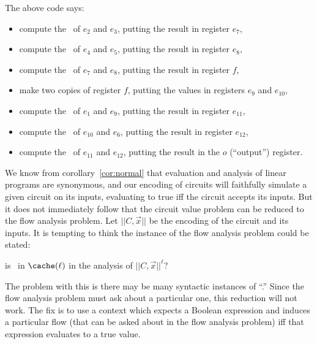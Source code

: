 The above code says:
\begin{itemize} 
\item compute the \AND\ of $e_2$ and $e_3$, putting the result in
  register $e_7$,
\item compute the \AND\ of $e_4$ and $e_5$, putting the result in
  register $e_8$,
\item compute the \AND\ of $e_7$ and $e_8$, putting the result in
  register $f$,
\item make two copies of register $f$, putting the values in registers
  $e_9$ and $e_{10}$,
\item compute the \Or\ of $e_1$ and $e_9$, putting the result in
  register $e_{11}$,
\item compute the \Or\ of $e_{10}$ and $e_6$, putting the result in
  register $e_{12}$,
\item compute the \Or\ of $e_{11}$ and $e_{12}$, putting the result in
  the $o$ (``output'') register.
\end{itemize}

We know from corollary~\ref{cor:normal} that evaluation and analysis
of linear programs are synonymous, and our encoding of circuits will
faithfully simulate a given circuit on its inputs, evaluating to true
iff the circuit accepts its inputs.  But it does not immediately
follow that the circuit value problem can be reduced to the flow
analysis problem.  Let $||C,\vec{x}||$ be the encoding of the circuit
and its inputs.  It is tempting to think the instance of the flow
analysis problem could be stated:
\begin{center}
is \True\ in $\cache(\ell)$ in the analysis
of $||C,\vec{x}||^\ell$?
\end{center}
The problem with this is there may be many syntactic instances of
``\True.''  Since the flow analysis problem must ask about a particular
one, this reduction will not work.  The fix is to use a context which
expects a Boolean expression and induces a particular flow (that can
be asked about in the flow analysis problem) iff that expression
evaluates to a true value.

